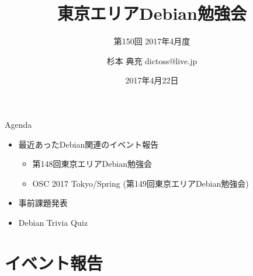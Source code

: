 \title{東京エリアDebian勉強会}
\subtitle{第150回 2017年4月度}
\author{杉本 典充  dictoss@live.jp}
\date{2017年4月22日}



\begin{frame}
\titlepage{}
\end{frame}

\begin{frame}{Agenda}
 \begin{minipage}[t]{0.45\hsize}
  \begin{itemize}
  \item 最近あったDebian関連のイベント報告
	\begin{itemize}
	\item 第148回東京エリアDebian勉強会
    \item OSC 2017 Tokyo/Spring (第149回東京エリアDebian勉強会)
	\end{itemize}
  \item 事前課題発表
  \end{itemize}
 \end{minipage}
 \begin{minipage}[t]{0.45\hsize}
  \begin{itemize}
   \item Debian Trivia Quiz
  \end{itemize}
 \end{minipage}
\end{frame}

\section{イベント報告}

